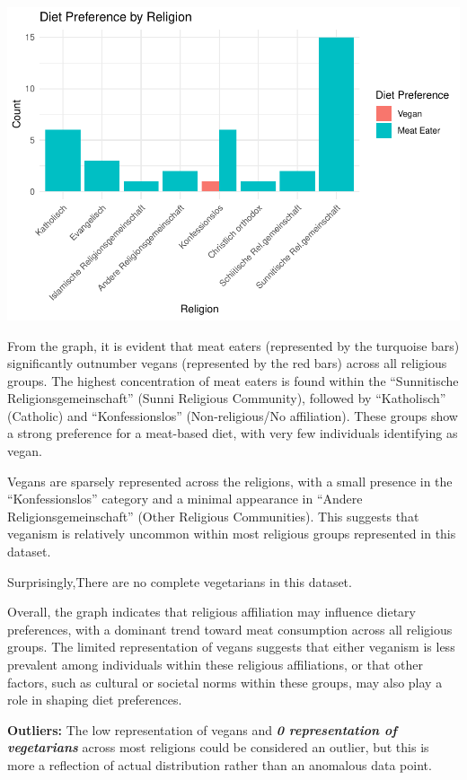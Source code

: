 \documentclass[
]{article}
\begin{document}
\includegraphics{Final-v2_files/figure-latex/Relegion~analysis-1.pdf}

From the graph, it is evident that meat eaters (represented by the
turquoise bars) significantly outnumber vegans (represented by the red
bars) across all religious groups. The highest concentration of meat
eaters is found within the ``Sunnitische Religionsgemeinschaft'' (Sunni
Religious Community), followed by ``Katholisch'' (Catholic) and
``Konfessionslos'' (Non-religious/No affiliation). These groups show a
strong preference for a meat-based diet, with very few individuals
identifying as vegan.

Vegans are sparsely represented across the religions, with a small
presence in the ``Konfessionslos'' category and a minimal appearance in
``Andere Religionsgemeinschaft'' (Other Religious Communities). This
suggests that veganism is relatively uncommon within most religious
groups represented in this dataset.

Surprisingly,There are no complete vegetarians in this dataset.

Overall, the graph indicates that religious affiliation may influence
dietary preferences, with a dominant trend toward meat consumption
across all religious groups. The limited representation of vegans
suggests that either veganism is less prevalent among individuals within
these religious affiliations, or that other factors, such as cultural or
societal norms within these groups, may also play a role in shaping diet
preferences.

\textbf{Outliers:} The low representation of vegans and \textbf{\emph{0
representation of vegetarians}} across most religions could be
considered an outlier, but this is more a reflection of actual
distribution rather than an anomalous data point.
\end{document}
